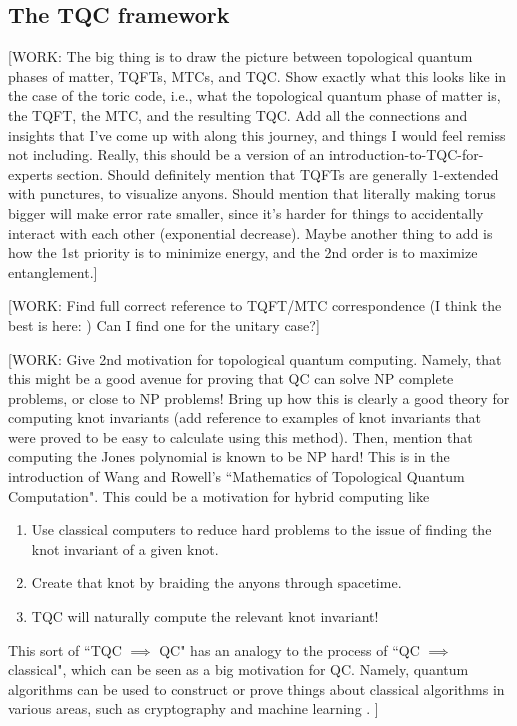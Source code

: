 \documentclass{article}
\theoremstyle{definition}
\numberwithin{figure}{section}
\begin{document}
\subsection{The TQC framework}
\label{The TQC framework}

[WORK: The big thing is to draw the picture between topological quantum phases of matter, TQFTs, MTCs, and TQC. Show exactly what this looks like in the case of the toric code, i.e., what the topological quantum phase of matter is, the TQFT, the MTC, and the resulting TQC. Add all the connections and insights that I've come up with along this journey, and things I would feel remiss not including. Really, this should be a version of an introduction-to-TQC-for-experts section. Should definitely mention that TQFTs are generally $1$-extended with punctures, to visualize anyons. Should mention that literally making torus bigger will make error rate smaller, since it's harder for things to accidentally interact with each other (exponential decrease). Maybe another thing to add is how the 1st priority is to minimize energy, and the 2nd order is to maximize entanglement.]


[WORK: Find full correct reference to TQFT/MTC correspondence (I think the best is here: \cite{bartlett2015modular}) Can I find one for the unitary case?]

[WORK: Give 2nd motivation for topological quantum computing. Namely, that this might be a good avenue for proving that QC can solve NP complete problems, or close to NP problems! Bring up how this is clearly a good theory for computing knot invariants (add reference to examples of knot invariants that were proved to be easy to calculate using this method). Then, mention that computing the Jones polynomial is known to be NP hard! This is in the introduction of Wang and Rowell's ``Mathematics of Topological Quantum Computation". This could be a motivation for hybrid computing like

\begin{enumerate}
\item Use classical computers to reduce hard problems to the issue of finding the knot invariant of a given knot.
\item Create that knot by braiding the anyons through spacetime.
\item TQC will naturally compute the relevant knot invariant!
\end{enumerate}

This sort of ``TQC $\implies$ QC" has an analogy to the process of ``QC $\implies$ classical", which can be seen as a big motivation for QC. Namely, quantum algorithms can be used to construct or prove things about classical algorithms in various areas, such as cryptography \cite{regev2009lattices} and machine learning \cite{tang2019quantum}.
]
\end{document}
